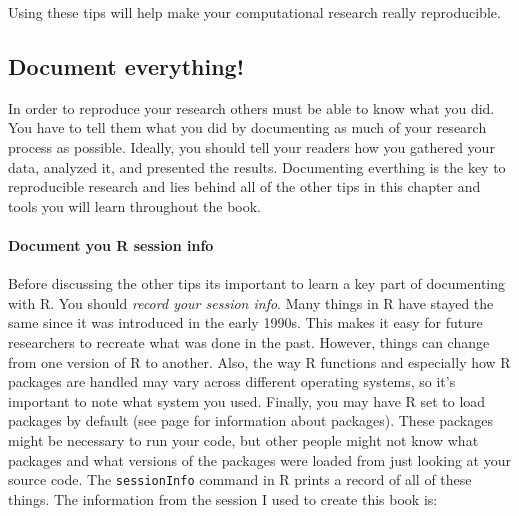 \noindent Using these tips will help make your computational research really reproducible.

\subsection{Document everything!}

In order to reproduce your research others must be able to know what you did. You have to tell them what you did by documenting as much of your research process as possible. Ideally, you should tell your readers how you gathered your data, analyzed it, and presented the results. Documenting everthing is the key to reproducible research and lies behind all of the other tips in this chapter and tools you will learn throughout the book.

\paragraph{Document you R session info}

Before discussing the other tips its important to learn a key part of documenting with R. You should \emph{record your session info}. Many things in R have stayed the same since it was introduced in the early 1990s. This makes it easy for future researchers to recreate what was done in the past. However, things can change from one version of R to another. Also, the way R functions and especially how R packages are handled may vary across different operating systems, so it's important to note what system you used. Finally, you may have R set to load packages by default (see page \pageref{Packages} for information about packages). These packages might be necessary to run your code, but other people might not know what packages and what versions of the packages were loaded from just looking at your source code. The \texttt{sessionInfo} command in R prints a record of all of these things. The information from the session I used to create this book is:


